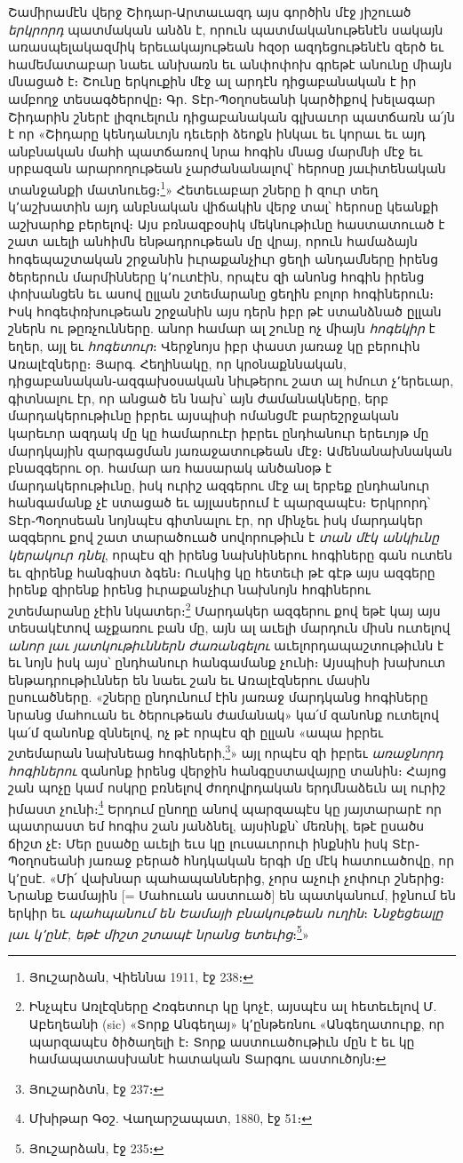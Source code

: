 \documentclass{article}
\begin{document}
{Շամիրամէն վերջ Շիդար֊Արտաւազդ այս գործին մէջ յիշուած \emph{երկրորդ} պատմական անձն է, որուն պատմականութենէն սակայն առասպելակազմիկ երեւակայութեան հզօր ազդեցութենէն զերծ եւ համեմատաբար նաեւ անխառն եւ անփոփոխ գրեթէ անունը միայն մնացած է։ Շունը երկուքին մէջ ալ արդէն դիցաբանական է իր ամբողջ տեսագծերովը։ Գր. Տէր֊Պօղոսեանի կարծիքով խելագար Շիդարին շներէ լիզուելուն դիցաբանական գլխաւոր պատճառն ա՛յն է որ «Շիդարը կենդանւոյն դեւերի ձեոքն ինկաւ եւ կորաւ եւ այդ անբնական մահի պատճառով նրա հոգին մնաց մարմնի մէջ եւ սրբազան արարողութեան չարժանանալով՝ հերոսը յաւիտենական տանջանքի մատնուեց։\footnote{Յուշարձան, Վիեննա 1911, էջ 238։}» Հետեւաբար շները ի զուր տեղ կ՚աշխատին այդ անբնական վիճակին վերջ տալ՝ հերոսը կեանքի աշխարհք բերելով։ Այս բռնազբօսիկ մեկնութիւնը հաստատուած է շատ աւելի անհիմն ենթադրութեան մը վրայ, որուն համաձայն հոգեպաշտական շրջանին իւրաքանչիւր ցեղի անդամները իրենց ծերերուն մարմինները կ՚ուտէին, որպէս զի անոնց հոգին իրենց փոխանցեն եւ ասով ըլլան շտեմարանը ցեղին բոլոր հոգիներուն։ Իսկ հոգեփռխութեան շրջանին այս դերն իբր թէ ստանձնած ըլլան շներն ու թըռչունները. անոր համար ալ շունը ոչ միայն \emph{հոգեկիր} է եղեր, այլ եւ \emph{հոգետուր}։ Վերջնոյս իբր փաստ յառաջ կը բերուին Առալէզները։ Յարգ. Հեղինակը, որ կրօնաքննական, դիցաբանական֊ազգախօսական նիւթերու շատ ալ հմուտ չ՚երեւար, գիտնալու էր, որ անցած են նախ՝ այն ժամանակները, երբ մարդակերութիւնը իբրեւ այսպիսի ոմանցմէ բարեշրջական կարեւոր ազդակ մը կը համարուէր իբրեւ ընդհանուր երեւոյթ մը մարդկային զարգացման յառաջատութեան մէջ։ Ամենանախնական բնազգերու օր. համար առ հասարակ անծանօթ է մարդակերութիւնը, իսկ ուրիշ ազգերու մէջ ալ երբեք ընդհանուր հանգամանք չէ ստացած եւ այլասերում է պարզապէս։ Երկրորդ՝ Տէր֊Պօղոսեան նոյնպէս գիտնալու էր, որ մինչեւ իսկ մարդակեր ազգերու քով շատ տարածուած սովորութիւն է \emph{տան մէկ անկիւնը կերակուր դնել}, որպէս զի իրենց նախնիներու հոգիները գան ուտեն եւ զիրենք հանգիստ ձգեն։ Ուսկից կը հետեւի թէ գէթ այս ազգերը իրենք զիրենք իրենց իւրաքանչիւր նախնոյն հոգիներու շտեմարանը չէին նկատեր։\footnote{Ինչպէս Առլէզները Հռգետուր կը կոչէ, այսպէս ալ հետեւելով Մ. Աբեղեանի (sic) «Տորք Անգեղայ» կ՚ընթեռնու «Անգեղատուրք, որ պարզապէս ծիծաղելի է։ Տորք աստուածութիւն մըն է եւ կը համապատասխանէ հատական Տարգու աստուծոյն։} Մարդակեր ազգերու քով եթէ կայ այս տեսակէտով աչքառու բան մը, այն ալ աւելի մարդուն միսն ուտելով \emph{անոր լաւ յատկութիւններն ժառանգելու} աւելորդապաշտութիւնն է եւ նոյն իսկ այս՝ ընդհանուր հանգամանք չունի։ Այսպիսի խախուտ ենթադրութիւններ են նաեւ շան եւ Առալէզներու մասին ըսուածները. «շները ընդունում էին յառաջ մարդկանց հոգիները նրանց մահուան եւ ծերութեան ժամանակ» կա՛մ զանոնք ուտելով կա՛մ զանոնք զննելով, ոչ թէ որպէս զի ըլլան «ապա իբրեւ շտեմարան նախնեաց հոգիների,\footnote{Յուշարձտն, էջ 237։}» այլ որպէս զի իբրեւ \emph{առաջնորդ հոգիներու} զանոնք իրենց վերջին հանգըստավայրը տանին։ Հայոց շան պոչը կամ ոսկրը բռնելով ժողովրդական երդմնաձեւն ալ ուրիշ իմաստ չունի։\footnote{Մխիթար Գօշ. Վաղարշապատ, 1880, էջ 51։} Երդում ընողը անով պարզապէս կը յայտարարէ որ պատրաստ եմ հոգիս շան յանձնել, այսինքն՝ մեռնիլ, եթէ ըսածս ճիշտ չէ։ Մեր ըսածը աւելի եւս կը լուսաւորուի ինքնին իսկ Տէր֊Պօղոսեանի յառաջ բերած հնդկական երգի մը մէկ հատուածովը, որ կ՚ըսէ. «Մի՛ վախնար պահապաններից, չորս աչուի չոփուր շներից։ Նրանք Եամային [= Մահուան աստուած] են պատկանում, իջնում են երկիր եւ \emph{պահպանում են Եամայի բնակութեան ուղին}։ \emph{Ննջեցեալը լաւ կ՚ընէ, եթէ միշտ շտապէ նրանց ետեւից}։\footnote{Յուշարձան, էջ 235։}»

}
\end{document}
